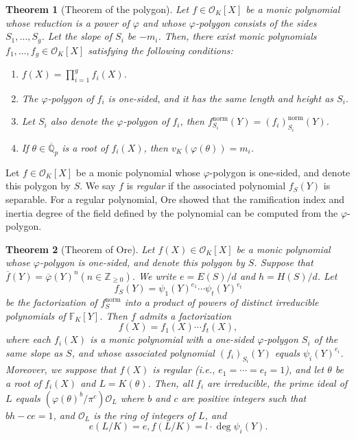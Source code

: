 \documentclass{article}
\newcommand{\field}[1]{\mathbb{#1}}
\newcommand{\Z}{\field{Z}}
\newcommand{\Q}{\field{Q}}
\newtheorem{theorem}{Theorem}[section]
\theoremstyle{definition}
\theoremstyle{remark}
\numberwithin{equation}{section}
\begin{document}
    \begin{theorem}[Theorem of the polygon]\label{thm:theorem of the polygon}
      Let $f \in \mathcal{O}_K[X]$ be a monic polynomial whose reduction is a power of $\varphi$ and whose $\varphi$-polygon
      consists of the sides $S_1, \dots ,S_g$. Let the slope of $S_{i}$ be $-m_i$. 
      Then, there exist monic polynomials $f_1, \dots ,f_g \in \mathcal{O}_K[X]$ 
      satisfying the following conditions: 
      \begin{enumerate}
        \item $ f(X) = \displaystyle \prod_{i = 1}^g f_i(X) $. 

        \item The $\varphi$-polygon of $f_i$ is one-sided, and it has the same length and height as $S_{i}$. 

        \item Let $S_{i}$ also denote the $\varphi$-polygon of $f_i$, then $f_{S_{i}}^{\mathrm{norm}}(Y) = (f_i)_{S_{i}}^{\mathrm{norm}}(Y)$. 

        \item If $\theta \in \overline{\Q}_p$ is a root of $f_i(X)$, then $v_K(\varphi(\theta)) = m_i$. 
      \end{enumerate}
    \end{theorem}

    Let $f \in \mathcal{O}_K[X]$ be a monic polynomial whose $\varphi$-polygon is one-sided, and denote this polygon by $S$. 
    We say $f$ is \emph{regular} if the associated polynomial $f_S(Y)$ is separable. 
    For a regular polynomial, Ore showed that the ramification index and inertia degree of the field defined by the polynomial can be computed from the $\varphi$-polygon. 

    \begin{theorem}[Theorem of Ore]\label{thm:theorem of Ore}
      Let $f(X) \in \mathcal{O}_K[X]$ be a monic polynomial whose $\varphi$-polygon is one-sided, and denote this polygon by $S$. 
      Suppose that $\overline{f}(Y) = \overline{\varphi}(Y)^n (n \in \Z_{\ge 0})$. 
      We write $e=E(S)/d$ and $h=H(S)/d$. Let 
      \[
        f_S(Y) = \psi_1(Y)^{e_1} \cdots \psi_t(Y)^{e_t} 
      \]
      be the factorization of $f_S^{\mathrm{norm}}$ into a product of powers of distinct irreducible polynomials
      of $\field{F}_K[Y]$. 
      Then $f$ admits a factorization 
      \[
        f(X) = f_1(X) \cdots f_t(X), 
      \]
      where each $f_i(X)$ is a monic polynomial with a one-sided $\varphi$-polygon $S_{i}$ 
      of the same slope as $S$, and whose associated polynomial $(f_i)_{S_{i}}(Y)$ equals $\psi_i(Y)^{e_i}$. 
      Moreover, we suppose that $f(X)$ is regular (i.e., $e_1 = \cdots = e_t = 1$), and let $\theta$ be a root of $f_i(X)$ and $L = K(\theta)$. 
      Then, all $f_i$ are irreducible, the prime ideal of $L$ equals $(\varphi(\theta)^b/\pi^c)\mathcal{O}_L$ 
      where $b$ and $c$ are positive integers such that $bh - ce = 1$, and $\mathcal{O}_L$ is the ring of integers of $L$, and 
      \[
        e(L/K) = e, f(L/K) = l \cdot \deg \psi_i(Y). 
      \]
    \end{theorem}
\end{document}
